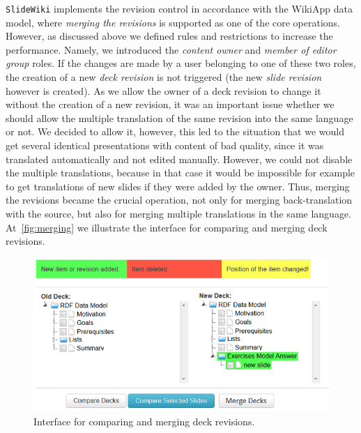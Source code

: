 \documentclass[PhD, Submit, ngerman,UKenglish,table]{scrbook}
\begin{document}
\texttt{SlideWiki} implements the revision control in accordance with the WikiApp data model, where \emph{merging the revisions} is supported as one of the core operations.
However, as discussed above we defined rules and restrictions to increase the performance.
Namely, we introduced the \emph{content owner} and \emph{member of editor group} roles.
If the changes are made by a user belonging to one of these two roles, the creation of a new \emph{deck revision} is not triggered (the new \emph{slide revision} however is created).
As we allow the owner of a deck revision to change it without the creation of a new revision, it was an important issue whether we should allow the multiple translation of the same revision into the same language or not.
We decided to allow it, however, this led to the situation that we would get several identical presentations with content of bad quality, since it was translated automatically and not edited manually.
However, we could not disable the multiple translations, because in that case it would be impossible for example to get translations of new slides if they were added by the owner.
Thus, merging the revisions became the crucial operation, not only for merging back-translation with the source, but also for merging multiple translations in the same language.
At~\autoref{fig:merging} we illustrate the interface for comparing and merging deck revisions.

\begin{figure}[!htb]
	\centering
		\includegraphics{Images/merging.png}
	\caption{Interface for comparing and merging deck revisions.}
	\label{fig:merging}
\end{figure}
\end{document}
